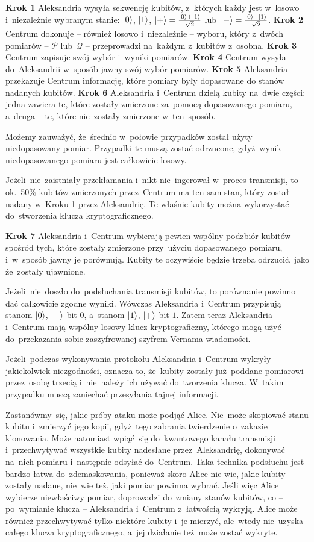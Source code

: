 \textbf{Krok 1} Aleksandria wysyła sekwencję kubitów, z~których każdy jest w~losowo
i~niezależnie wybranym stanie: $\ket{0}$, $\ket{1}$,
$\ket{+}=\frac{\ket{0}+\ket{1}}{\sqrt{2}}$ lub~$\ket{-}=\frac{\ket{0}-\ket{1}}{\sqrt{2}}$.
\textbf{Krok 2} Centrum dokonuje -- również losowo i~niezależnie --
wyboru, który z~dwóch pomiarów -- $\mathcal{P}$ lub~$\mathcal{Q}$ -- przeprowadzi na~każdym z~kubitów z~osobna.
\textbf{Krok 3} Centrum zapisuje swój wybór i~wyniki pomiarów.
\textbf{Krok 4} Centrum wysyła do~Aleksandrii w~sposób jawny swój wybór pomiarów.
\textbf{Krok 5} Aleksandria przekazuje Centrum informację, które pomiary były dopasowane do stanów
nadanych kubitów.
\textbf{Krok 6} Aleksandria i~Centrum dzielą kubity na~dwie części: jedna zawiera te, które
zostały zmierzone za~pomocą dopasowanego pomiaru, a~druga -- te, które nie~zostały zmierzone w~ten~sposób.

Możemy zauważyć, że~średnio w~połowie przypadków został użyty
niedopasowany pomiar. Przypadki te muszą zostać odrzucone, gdyż~wynik
niedopasowanego pomiaru jest całkowicie losowy.

Jeżeli~nie~zaistniały przekłamania i~nikt nie~ingerował w~proces
transmisji, to ok.~50\% kubitów zmierzonych przez~Centrum ma ten sam  stan, który został nadany w~Kroku 1 przez Aleksandrię. Te właśnie kubity można wykorzystać do~stworzenia klucza kryptograficznego.

\textbf{Krok 7} Aleksandria i~Centrum wybierają pewien wspólny
podzbiór kubitów spośród tych, które zostały zmierzone przy~użyciu
dopasowanego pomiaru, i~w~sposób jawny je porównują. Kubity te oczywiście
będzie trzeba odrzucić, jako że~zostały ujawnione.

Jeżeli~nie~doszło do~podsłuchania transmisji kubitów, to porównanie
powinno dać całkowicie zgodne wyniki. Wówczas Aleksandria i~Centrum
przypisują stanom $\ket{0}$, $\ket{-}$ bit $0$, a~stanom $\ket{1}$,
$\ket{+}$ bit $1$. Zatem teraz Aleksandria i~Centrum mają wspólny
losowy klucz kryptograficzny, którego mogą użyć do~przekazania sobie
zaszyfrowanej szyfrem Vernama wiadomości.

Jeżeli~podczas wykonywania protokołu Aleksandria i~Centrum wykryły
jakiekolwiek niezgodności, oznacza to, że~kubity zostały już~poddane
pomiarowi przez~osobę trzecią i~nie~należy ich używać do~tworzenia
klucza. W~takim przypadku muszą zaniechać przesyłania tajnej informacji.

Zastanówmy~się, jakie próby ataku może podjąć Alice. Nie~może skopiować
stanu kubitu i~zmierzyć jego kopii, gdyż~tego zabrania twierdzenie
o~zakazie klonowania. Może natomiast wpiąć~się do~kwantowego kanału
transmisji i~przechwytywać wszystkie kubity nadesłane przez~Aleksandrię,
dokonywać na~nich pomiaru i~następnie odsyłać do~Centrum. Taka technika
podsłuchu jest bardzo łatwa do~zdemaskowania, ponieważ skoro Alice nie wie, jakie
kubity zostały nadane, nie~wie też, jaki pomiar powinna wybrać. Jeśli więc Alice wybierze
niewłaściwy pomiar, doprowadzi do~zmiany stanów kubitów, co --
po~wymianie klucza -- Aleksandria i~Centrum z~łatwością wykryją. Alice
może również przechwytywać tylko niektóre kubity i~je mierzyć, ale~wtedy
nie~uzyska całego klucza kryptograficznego, a~jej działanie też~może
zostać wykryte.

